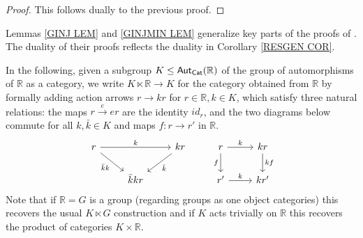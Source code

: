 \documentclass[a4paper,10pt
 ,draft
]{article}%
\begin{document}
\begin{proof}
This follows dually to the previous proof.
\end{proof}

\begin{remark}
      \label{GINJ REM}
Lemmas \ref{GINJ LEM} and \ref{GINJMIN LEM} generalize key parts of the proofs of \cite[Lemmas 5.3 and 5.5]{BM11}.  
The duality of their proofs reflects the duality in 
Corollary \ref{RESGEN COR}.
\end{remark}


In the following, given a subgroup $K \leq \mathsf{Aut}_{\mathsf{Cat}}(\mathbb{R})$ of the group of automorphisms of $\mathbb R$ as a category,
we write $K \ltimes \mathbb{R} \to K$ 
for the category obtained from $\mathbb{R}$ by formally adding action arrows
$r \to kr$ for $r \in \mathbb{R},k \in K$,
which satisfy three natural relations:
the maps $r \xrightarrow{e} e r$
are the identity $id_r$, and the two diagrams below commute
for all $k,\bar{k} \in K$ and maps $f: r \to r'$ in $\mathbb R$.
%
\[
      \begin{tikzcd}%
            r \arrow[rr, "k"] \arrow[dr, "\bar{k}k"']
            &&
            k r \arrow[dl, "\bar{k}"]
            & %
            r \arrow[r, "k"] \arrow[d, "f"']
            &
            k r \arrow[d, "k f"]
            \\
            &
            \bar{k} k r
            &
            & %
            r' \arrow[r, "k"]
            &
            k r'
      \end{tikzcd}
\]
Note that 
if $\mathbb{R}=G$ is a group (regarding groups as one object categories) this recovers the usual $K \ltimes G$ construction and
if $K$ acts trivially on $\mathbb{R}$ this recovers the product of categories $K \times \mathbb{R}$.
\end{document}
